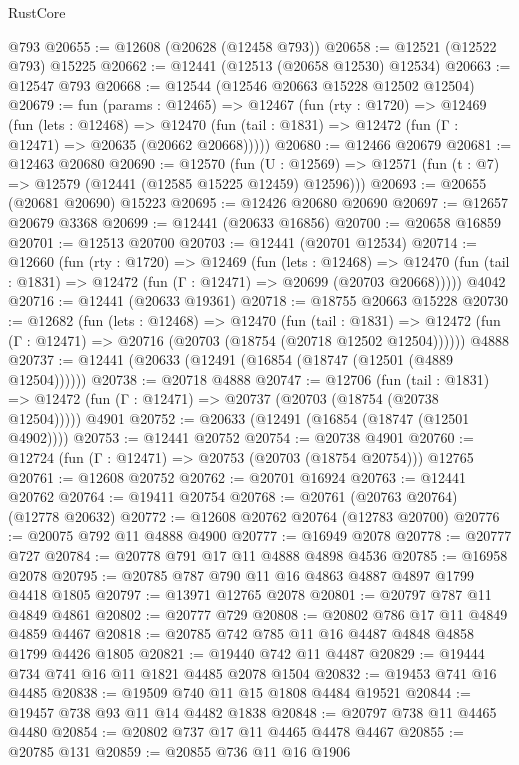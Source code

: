 \begin{lexlean}{RustCore}
\begin{coremodule}
    @793
@20655 := @12608 (@20628 (@12458 @793))
@20658 := @12521 (@12522 @793) @15225
@20662 := @12441 (@12513 (@20658 @12530) @12534)
@20663 := @12547 @793
@20668 := @12544 (@12546 @20663 @15228 @12502 @12504)
@20679 := fun (params : @12465) =>
  @12467
    (fun (rty : @1720) =>
    @12469
      (fun (lets : @12468) =>
      @12470 (fun (tail : @1831) => @12472 (fun (Γ : @12471) => @20635 (@20662 @20668)))))
@20680 := @12466 @20679
@20681 := @12463 @20680
@20690 := @12570
    (fun (U : @12569) => @12571 (fun (t : @7) => @12579 (@12441 (@12585 @15225 @12459) @12596)))
@20693 := @20655 (@20681 @20690) @15223
@20695 := @12426 @20680 @20690
@20697 := @12657 @20679 @3368
@20699 := @12441 (@20633 @16856)
@20700 := @20658 @16859
@20701 := @12513 @20700
@20703 := @12441 (@20701 @12534)
@20714 := @12660
    (fun (rty : @1720) =>
    @12469
      (fun (lets : @12468) =>
      @12470 (fun (tail : @1831) => @12472 (fun (Γ : @12471) => @20699 (@20703 @20668)))))
    @4042
@20716 := @12441 (@20633 @19361)
@20718 := @18755 @20663 @15228
@20730 := @12682
    (fun (lets : @12468) =>
    @12470
      (fun (tail : @1831) =>
      @12472 (fun (Γ : @12471) => @20716 (@20703 (@18754 (@20718 @12502 @12504))))))
    @4888
@20737 := @12441 (@20633 (@12491 (@16854 (@18747 (@12501 (@4889 @12504))))))
@20738 := @20718 @4888
@20747 := @12706
    (fun (tail : @1831) => @12472 (fun (Γ : @12471) => @20737 (@20703 (@18754 (@20738 @12504)))))
    @4901
@20752 := @20633 (@12491 (@16854 (@18747 (@12501 @4902))))
@20753 := @12441 @20752
@20754 := @20738 @4901
@20760 := @12724 (fun (Γ : @12471) => @20753 (@20703 (@18754 @20754))) @12765
@20761 := @12608 @20752
@20762 := @20701 @16924
@20763 := @12441 @20762
@20764 := @19411 @20754
@20768 := @20761 (@20763 @20764) (@12778 @20632)
@20772 := @12608 @20762 @20764 (@12783 @20700)
@20776 := @20075 @792 @11 @4888 @4900
@20777 := @16949 @2078
@20778 := @20777 @727
@20784 := @20778 @791 @17 @11 @4888 @4898 @4536
@20785 := @16958 @2078
@20795 := @20785 @787 @790 @11 @16 @4863 @4887 @4897 @1799 @4418 @1805
@20797 := @13971 @12765 @2078
@20801 := @20797 @787 @11 @4849 @4861
@20802 := @20777 @729
@20808 := @20802 @786 @17 @11 @4849 @4859 @4467
@20818 := @20785 @742 @785 @11 @16 @4487 @4848 @4858 @1799 @4426 @1805
@20821 := @19440 @742 @11 @4487
@20829 := @19444 @734 @741 @16 @11 @1821 @4485 @2078 @1504
@20832 := @19453 @741 @16 @4485
@20838 := @19509 @740 @11 @15 @1808 @4484 @19521
@20844 := @19457 @738 @93 @11 @14 @4482 @1838
@20848 := @20797 @738 @11 @4465 @4480
@20854 := @20802 @737 @17 @11 @4465 @4478 @4467
@20855 := @20785 @131
@20859 := @20855 @736 @11 @16 @1906

\end{coremodule}
\end{lexlean}
